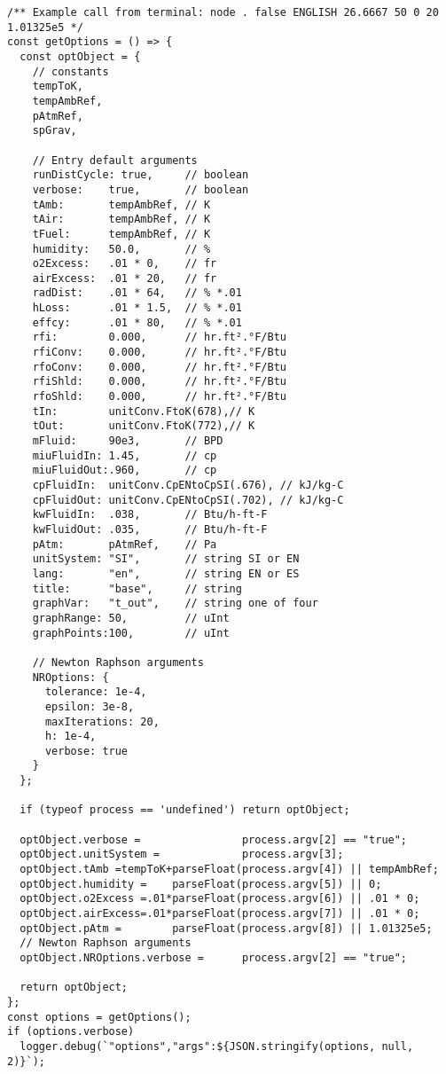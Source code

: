 \begin{verbatim}
/** Example call from terminal: node . false ENGLISH 26.6667 50 0 20 1.01325e5 */ 
const getOptions = () => {
  const optObject = {
    // constants
    tempToK,
    tempAmbRef,
    pAtmRef,
    spGrav,

    // Entry default arguments
    runDistCycle: true,     // boolean
    verbose:    true,       // boolean
    tAmb:       tempAmbRef, // K
    tAir:       tempAmbRef, // K
    tFuel:      tempAmbRef, // K
    humidity:   50.0,       // %
    o2Excess:   .01 * 0,    // fr
    airExcess:  .01 * 20,   // fr
    radDist:    .01 * 64,   // % *.01
    hLoss:      .01 * 1.5,  // % *.01
    effcy:      .01 * 80,   // % *.01
    rfi:        0.000,      // hr.ft².°F/Btu
    rfiConv:    0.000,      // hr.ft².°F/Btu
    rfoConv:    0.000,      // hr.ft².°F/Btu
    rfiShld:    0.000,      // hr.ft².°F/Btu
    rfoShld:    0.000,      // hr.ft².°F/Btu
    tIn:        unitConv.FtoK(678),// K
    tOut:       unitConv.FtoK(772),// K
    mFluid:     90e3,       // BPD
    miuFluidIn: 1.45,       // cp
    miuFluidOut:.960,       // cp
    cpFluidIn:  unitConv.CpENtoCpSI(.676), // kJ/kg-C
    cpFluidOut: unitConv.CpENtoCpSI(.702), // kJ/kg-C 
    kwFluidIn:  .038,       // Btu/h-ft-F
    kwFluidOut: .035,       // Btu/h-ft-F
    pAtm:       pAtmRef,    // Pa
    unitSystem: "SI",       // string SI or EN
    lang:       "en",       // string EN or ES
    title:      "base",     // string
    graphVar:   "t_out",    // string one of four
    graphRange: 50,         // uInt
    graphPoints:100,        // uInt
  
    // Newton Raphson arguments
    NROptions: {
      tolerance: 1e-4,
      epsilon: 3e-8,
      maxIterations: 20,
      h: 1e-4,
      verbose: true
    }
  };
  
  if (typeof process == 'undefined') return optObject;

  optObject.verbose =                process.argv[2] == "true";
  optObject.unitSystem =             process.argv[3];
  optObject.tAmb =tempToK+parseFloat(process.argv[4]) || tempAmbRef;
  optObject.humidity =    parseFloat(process.argv[5]) || 0;
  optObject.o2Excess =.01*parseFloat(process.argv[6]) || .01 * 0;
  optObject.airExcess=.01*parseFloat(process.argv[7]) || .01 * 0;
  optObject.pAtm =        parseFloat(process.argv[8]) || 1.01325e5;
  // Newton Raphson arguments
  optObject.NROptions.verbose =      process.argv[2] == "true";

  return optObject;
};
const options = getOptions();
if (options.verbose) 
  logger.debug(`"options","args":${JSON.stringify(options, null, 2)}`);


\end{verbatim}
